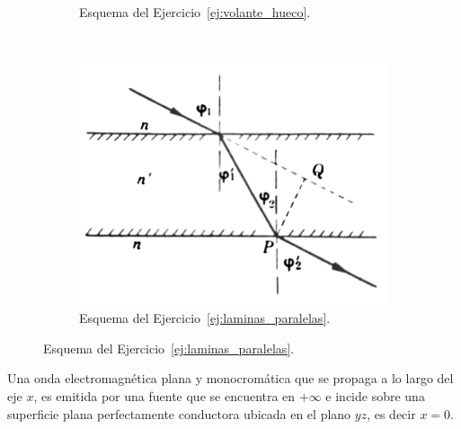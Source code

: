 \documentclass[addpoints]{exam}
\newcommand{\ver}[1]{\hat{\mathbf{#1}}}
\begin{document}
\begin{questions}
\begin{figure}[ht]
\begin{subfigure}{0.45\textwidth}
\begin{tikzpicture}
            \end{tikzpicture}
            \caption{Esquema del Ejercicio~\ref{ej:volante_hueco}.}
            \label{fig:volante_hueco}
        \end{subfigure}
        ~
        \begin{subfigure}{0.45\textwidth}
            \centering
            \includegraphics[width=\textwidth]{../../figs/lamina caras paralelas.pdf}
            \caption{Esquema del Ejercicio~\ref{ej:laminas_paralelas}.}
            \label{fig:lamina_paralelas}
        \end{subfigure}
        
    \end{figure}

    \pagebreak

    \question Una onda electromagnética plana y monocromática que se propaga a lo largo del eje $x$, es emitida por una fuente que se encuentra en $+\infty$ e incide sobre una superficie plana perfectamente conductora ubicada en el plano $yz$, es decir $x=0$.
\end{questions}
\end{document}
